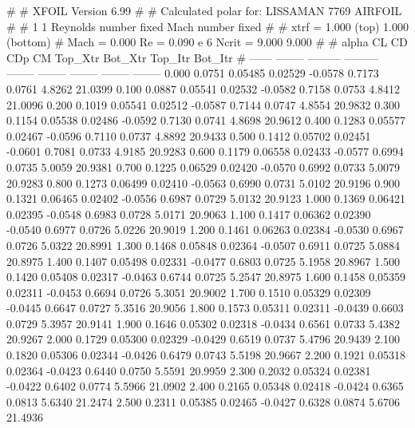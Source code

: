 #  
#       XFOIL         Version 6.99
#  
# Calculated polar for: LISSAMAN 7769 AIRFOIL                           
#  
# 1 1 Reynolds number fixed          Mach number fixed         
#  
# xtrf =   1.000 (top)        1.000 (bottom)  
# Mach =   0.000     Re =     0.090 e 6     Ncrit =   9.000  9.000
#  
#   alpha    CL        CD       CDp       CM     Top_Xtr  Bot_Xtr  Top_Itr  Bot_Itr
#  ------ -------- --------- --------- -------- -------- -------- -------- --------
   0.000   0.0751   0.05485   0.02529  -0.0578   0.7173   0.0761   4.8262  21.0399
   0.100   0.0887   0.05541   0.02532  -0.0582   0.7158   0.0753   4.8412  21.0096
   0.200   0.1019   0.05541   0.02512  -0.0587   0.7144   0.0747   4.8554  20.9832
   0.300   0.1154   0.05538   0.02486  -0.0592   0.7130   0.0741   4.8698  20.9612
   0.400   0.1283   0.05577   0.02467  -0.0596   0.7110   0.0737   4.8892  20.9433
   0.500   0.1412   0.05702   0.02451  -0.0601   0.7081   0.0733   4.9185  20.9283
   0.600   0.1179   0.06558   0.02433  -0.0577   0.6994   0.0735   5.0059  20.9381
   0.700   0.1225   0.06529   0.02420  -0.0570   0.6992   0.0733   5.0079  20.9283
   0.800   0.1273   0.06499   0.02410  -0.0563   0.6990   0.0731   5.0102  20.9196
   0.900   0.1321   0.06465   0.02402  -0.0556   0.6987   0.0729   5.0132  20.9123
   1.000   0.1369   0.06421   0.02395  -0.0548   0.6983   0.0728   5.0171  20.9063
   1.100   0.1417   0.06362   0.02390  -0.0540   0.6977   0.0726   5.0226  20.9019
   1.200   0.1461   0.06263   0.02384  -0.0530   0.6967   0.0726   5.0322  20.8991
   1.300   0.1468   0.05848   0.02364  -0.0507   0.6911   0.0725   5.0884  20.8975
   1.400   0.1407   0.05498   0.02331  -0.0477   0.6803   0.0725   5.1958  20.8967
   1.500   0.1420   0.05408   0.02317  -0.0463   0.6744   0.0725   5.2547  20.8975
   1.600   0.1458   0.05359   0.02311  -0.0453   0.6694   0.0726   5.3051  20.9002
   1.700   0.1510   0.05329   0.02309  -0.0445   0.6647   0.0727   5.3516  20.9056
   1.800   0.1573   0.05311   0.02311  -0.0439   0.6603   0.0729   5.3957  20.9141
   1.900   0.1646   0.05302   0.02318  -0.0434   0.6561   0.0733   5.4382  20.9267
   2.000   0.1729   0.05300   0.02329  -0.0429   0.6519   0.0737   5.4796  20.9439
   2.100   0.1820   0.05306   0.02344  -0.0426   0.6479   0.0743   5.5198  20.9667
   2.200   0.1921   0.05318   0.02364  -0.0423   0.6440   0.0750   5.5591  20.9959
   2.300   0.2032   0.05324   0.02381  -0.0422   0.6402   0.0774   5.5966  21.0902
   2.400   0.2165   0.05348   0.02418  -0.0424   0.6365   0.0813   5.6340  21.2474
   2.500   0.2311   0.05385   0.02465  -0.0427   0.6328   0.0874   5.6706  21.4936

